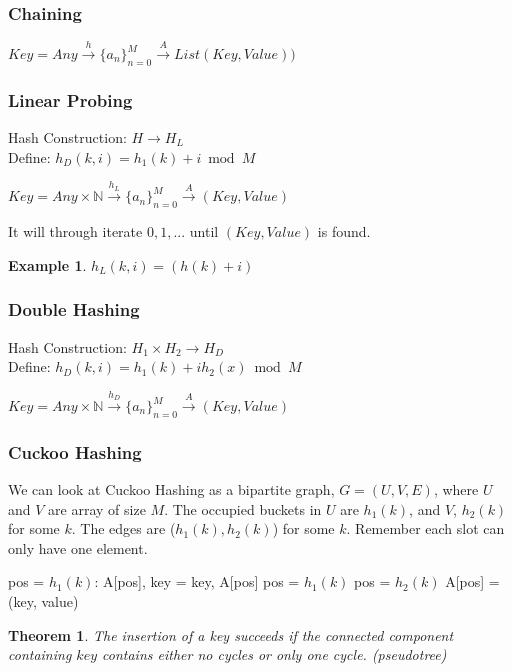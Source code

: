 \documentclass{article}
\theoremstyle{plain}
\newtheorem{thm}{Theorem}
\theoremstyle{definition}
\newtheorem{eg}{Example}
\begin{document}
\subsubsection{Chaining}
$Key = Any\xrightarrow{h}\{a_n\}^M_{n=0}\xrightarrow{A} List(Key, Value))$

\subsubsection{Linear Probing}
Hash Construction: $H \rightarrow H_L$\\
Define: $h_D(k, i) = h_1(k) + i \bmod{M}$

$Key = Any\times\mathbb{N}\xrightarrow{h_L}\{a_n\}^M_{n=0}\xrightarrow{A} (Key, Value)$

It will through iterate $0, 1, ...$ until $(Key, Value)$ is found.

\begin{eg}
    $h_L(k, i) = (h(k) + i)$
\end{eg}

\subsubsection{Double Hashing}
Hash Construction: $H_1\times H_2\rightarrow H_D$\\
Define: $h_D(k, i) = h_1(k) + ih_2(x) \bmod{M}$

$Key = Any\times\mathbb{N}\xrightarrow{h_D}\{a_n\}^M_{n=0}\xrightarrow{A} (Key, Value)$

\subsubsection{Cuckoo Hashing}
We can look at Cuckoo Hashing as a bipartite graph, $G = (U, V, E)$, where $U$ and $V$
are array of size $M$. The occupied buckets in $U$ are $h_1(k)$, and $V$, $h_2(k)$
for some $k$. The edges are ($h_1(k), h_2(k)$) for some $k$. Remember each slot can only
have one element.

\begin{algorithmic}[1]
    \State pos = $h_1(k)$:
        \State A[pos], key = key, A[pos]
            \State pos = $h_1(k)$
        \Else
            \State pos = $h_2(k)$
        \EndIf
    \EndWhile
    \State A[pos] = (key, value)
    \EndFunction
\end{algorithmic}

\begin{thm}
    The insertion of a key succeeds if the connected component containing
    $key$ contains either no cycles or only one cycle. (pseudotree)
\end{thm}
\end{document}

